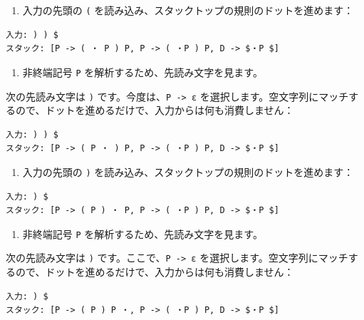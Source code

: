 \begin{enumerate}
\def\labelenumi{\arabic{enumi}.}
\setcounter{enumi}{4}
\tightlist
\item
  入力の先頭の \texttt{(}
  を読み込み、スタックトップの規則のドットを進めます：
\end{enumerate}

\begin{verbatim}
入力: ) ) $
スタック: [P -> ( ・ P ) P, P -> ( ・P ) P, D -> $・P $]
\end{verbatim}

\begin{enumerate}
\def\labelenumi{\arabic{enumi}.}
\setcounter{enumi}{5}
\tightlist
\item
  非終端記号 \texttt{P} を解析するため、先読み文字を見ます。
\end{enumerate}

次の先読み文字は \texttt{)} です。今度は、\texttt{P\ -\textgreater{}\ ε}
を選択します。空文字列にマッチするので、ドットを進めるだけで、入力からは何も消費しません：

\begin{verbatim}
入力: ) ) $
スタック: [P -> ( P ・ ) P, P -> ( ・P ) P, D -> $・P $]
\end{verbatim}

\begin{enumerate}
\def\labelenumi{\arabic{enumi}.}
\setcounter{enumi}{6}
\tightlist
\item
  入力の先頭の \texttt{)}
  を読み込み、スタックトップの規則のドットを進めます：
\end{enumerate}

\begin{verbatim}
入力: ) $
スタック: [P -> ( P ) ・ P, P -> ( ・P ) P, D -> $・P $]
\end{verbatim}

\begin{enumerate}
\def\labelenumi{\arabic{enumi}.}
\setcounter{enumi}{7}
\tightlist
\item
  非終端記号 \texttt{P} を解析するため、先読み文字を見ます。
\end{enumerate}

次の先読み文字は \texttt{)} です。ここで、\texttt{P\ -\textgreater{}\ ε}
を選択します。空文字列にマッチするので、ドットを進めるだけで、入力からは何も消費しません：

\begin{verbatim}
入力: ) $
スタック: [P -> ( P ) P ・, P -> ( ・P ) P, D -> $・P $]
\end{verbatim}

